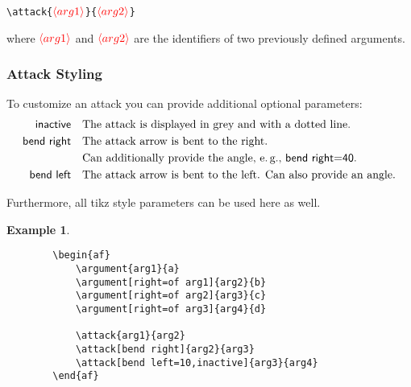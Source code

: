 \documentclass{article}
\newcommand{\opt}[2][red]{\ensuremath{\textcolor{#1}{\langle #2\rangle}}}
\newtheorem{example}{Example}
\begin{document}
    \noindent
    \verb|\attack{|\opt{arg1}\verb|}{|\opt{arg2}\verb|}|

    \begin{list}{}{\leftmargin=\parindent\rightmargin=0pt}
        \item where \opt{arg1} and \opt{arg2} are the identifiers of two previously defined arguments.
    \end{list}

    
\subsubsection{Attack Styling}
    To customize an attack you can provide additional optional parameters:
    \begin{align*}
        \mathsf{inactive} &\quad \text{The attack is displayed in grey and with a dotted line.}\\
        \mathsf{bend~right} &\quad \text{The attack arrow is bent to the right.}\\
        &\quad \text{Can additionally provide the angle, e.\,g., \textsf{bend~right=40}.}\\
        \mathsf{bend~left} &\quad \text{The attack arrow is bent to the left. Can also provide an angle.}\\
    \end{align*}
    
    Furthermore, all \textsf{tikz} style parameters can be used here as well.

    \begin{example}~
    \begin{verbatim}
        \begin{af}
            \argument{arg1}{a}
            \argument[right=of arg1]{arg2}{b}
            \argument[right=of arg2]{arg3}{c}
            \argument[right=of arg3]{arg4}{d}
    
            \attack{arg1}{arg2}
            \attack[bend right]{arg2}{arg3}
            \attack[bend left=10,inactive]{arg3}{arg4}
        \end{af}    
    \end{verbatim}

    \begin{center}
        \begin{af}
    
        \end{af}
    \end{center}
    \end{example}
    
\end{document}
